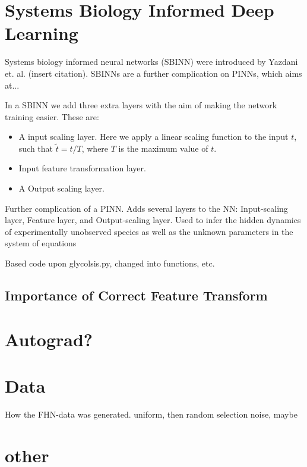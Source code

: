 \section{Systems Biology Informed Deep Learning}

Systems biology informed neural networks (SBINN) were introduced by Yazdani et. al. (insert citation).
SBINNs are a further complication on PINNs, which aims at...

In a SBINN we add three extra layers with the aim of making the network training easier. These are:
\begin{itemize}
	\item A input scaling layer. Here we apply a linear scaling function to the input $t$, such that $\tilde{t}=t / T$, where $T$ is the maximum value of $t$.
	\item Input feature transformation layer. 
	\item A Output scaling layer.
\end{itemize}


Further complication of a PINN. 
Adds several layers to the NN: Input-scaling layer, Feature layer, and Output-scaling layer.
Used to infer the hidden dynamics of experimentally unobserved species as well as the unknown parameters in the system of equations

Based code upon glycolsis.py, changed into functions, etc.




\subsection{Importance of Correct Feature Transform}





\section{Autograd?}








\section{Data}

How the FHN-data was generated.
uniform, then random selection
noise, maybe




\section{other}


















